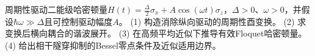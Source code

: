 周期性驱动二能级哈密顿量\(H(t)=\frac\Delta2\sigma_x+A\cos(\omega t)\sigma_z\)，\(\Delta>0\)、\(\omega>0\)，并假设\(\hbar\omega\gg\Delta\)且可控制驱动幅度\(A\)。
(1) 构造消除纵向驱动的周期性酉变换。
(2) 求变换后横向耦合的谐波展开。
(3) 在高频平均近似下推导有效Floquet哈密顿量。
(4) 给出相干隧穿抑制的Bessel零点条件及近似适用边界。
